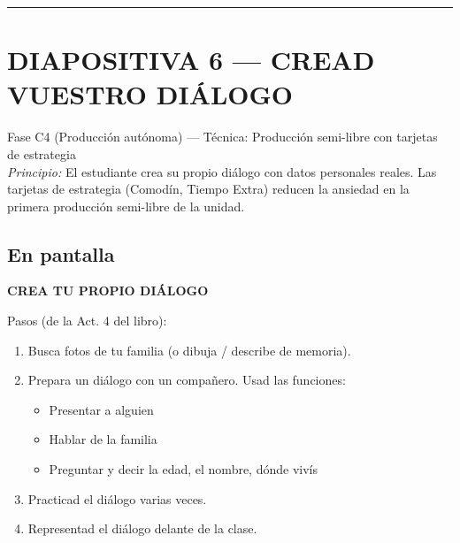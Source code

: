 \documentclass[a4paper,11pt]{article}
\begin{document}
\newpage


\noindent\textcolor{violeta}{\rule{\linewidth}{2.5pt}}

\section*{DIAPOSITIVA 6 — CREAD VUESTRO DIÁLOGO}

{\small Fase C4 (Producción autónoma) — Técnica: Producción semi-libre con tarjetas de estrategia}\\
{\small\textit{Principio:} El estudiante crea su propio diálogo con datos personales reales. Las tarjetas de estrategia (Comodín, Tiempo Extra) reducen la ansiedad en la primera producción semi-libre de la unidad.}

\vspace{0.5cm}

\subsection*{En pantalla}

\begin{center}
{\Large\textbf{CREA TU PROPIO DIÁLOGO}}
\end{center}

\vspace{0.3cm}

Pasos (de la Act. 4 del libro):
\begin{enumerate}[leftmargin=1.5cm, itemsep=3pt]
\item Busca fotos de tu familia (o dibuja / describe de memoria).
\item Prepara un diálogo con un compañero. Usad las funciones:
  \begin{itemize}[leftmargin=1cm]
  \item Presentar a alguien
  \item Hablar de la familia
  \item Preguntar y decir la edad, el nombre, dónde vivís
  \end{itemize}
\item Practicad el diálogo varias veces.
\item Representad el diálogo delante de la clase.
\end{enumerate}

\vspace{0.3cm}
\end{document}
